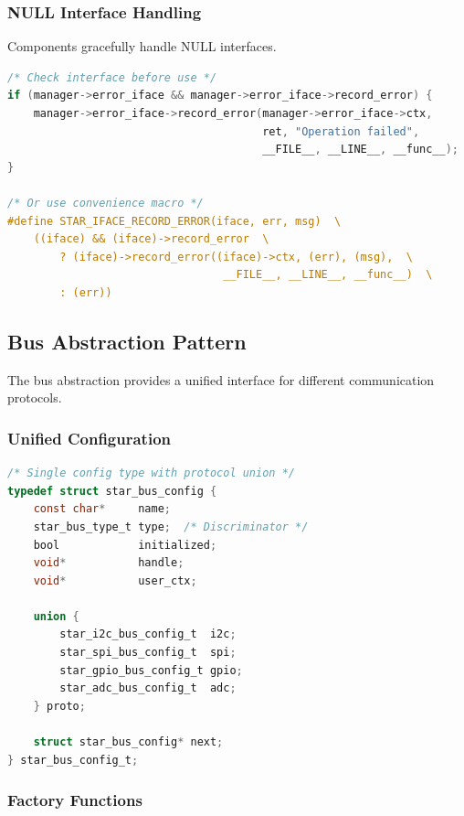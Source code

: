 \subsubsection{NULL Interface Handling}

Components gracefully handle NULL interfaces.

\begin{lstlisting}[language=C]
/* Check interface before use */
if (manager->error_iface && manager->error_iface->record_error) {
    manager->error_iface->record_error(manager->error_iface->ctx,
                                       ret, "Operation failed",
                                       __FILE__, __LINE__, __func__);
}

/* Or use convenience macro */
#define STAR_IFACE_RECORD_ERROR(iface, err, msg)  \
    ((iface) && (iface)->record_error  \
        ? (iface)->record_error((iface)->ctx, (err), (msg),  \
                                 __FILE__, __LINE__, __func__)  \
        : (err))
\end{lstlisting}

\subsection{Bus Abstraction Pattern}

The bus abstraction provides a unified interface for different communication protocols.

\subsubsection{Unified Configuration}

\begin{lstlisting}[language=C]
/* Single config type with protocol union */
typedef struct star_bus_config {
    const char*     name;
    star_bus_type_t type;  /* Discriminator */
    bool            initialized;
    void*           handle;
    void*           user_ctx;

    union {
        star_i2c_bus_config_t  i2c;
        star_spi_bus_config_t  spi;
        star_gpio_bus_config_t gpio;
        star_adc_bus_config_t  adc;
    } proto;

    struct star_bus_config* next;
} star_bus_config_t;
\end{lstlisting}

\subsubsection{Factory Functions}

